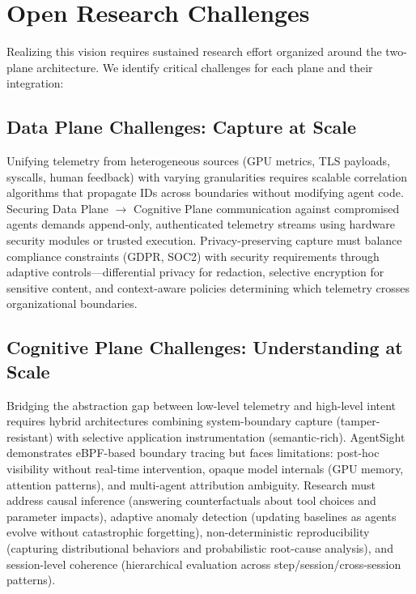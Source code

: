 \documentclass[sigplan,screen,9pt]{acmart}
\begin{document}
\section{Open Research Challenges}

Realizing this vision requires sustained research effort organized around the two-plane architecture. We identify critical challenges for each plane and their integration:

\subsection{Data Plane Challenges: Capture at Scale}

Unifying telemetry from heterogeneous sources (GPU metrics, TLS payloads, syscalls, human feedback) with varying granularities requires scalable correlation algorithms that propagate IDs across boundaries without modifying agent code. Securing Data Plane $\rightarrow$ Cognitive Plane communication against compromised agents demands append-only, authenticated telemetry streams using hardware security modules or trusted execution. Privacy-preserving capture must balance compliance constraints (GDPR, SOC2) with security requirements through adaptive controls---differential privacy for redaction, selective encryption for sensitive content, and context-aware policies determining which telemetry crosses organizational boundaries.

\subsection{Cognitive Plane Challenges: Understanding at Scale}

Bridging the abstraction gap between low-level telemetry and high-level intent requires hybrid architectures combining system-boundary capture (tamper-resistant) with selective application instrumentation (semantic-rich). AgentSight~\cite{zheng2025agentsight} demonstrates eBPF-based boundary tracing but faces limitations: post-hoc visibility without real-time intervention, opaque model internals (GPU memory, attention patterns), and multi-agent attribution ambiguity. Research must address causal inference (answering counterfactuals about tool choices and parameter impacts), adaptive anomaly detection (updating baselines as agents evolve without catastrophic forgetting), non-deterministic reproducibility (capturing distributional behaviors and probabilistic root-cause analysis), and session-level coherence (hierarchical evaluation across step/session/cross-session patterns).
\end{document}
